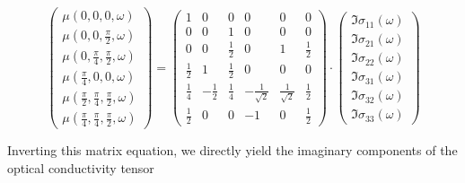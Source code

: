\documentclass[twocolumn,prb,twocolumn,amsmath,superscriptaddress,nofootinbib,amssymb]{revtex4-1}
\begin{document}
\begin{widetext}
\begin{equation}\label{eq: XAS non-magnetic}
\left(
\begin{array}{c}
\mu(0,0,0,\omega)  \\
\mu(0,0,\frac{\pi}{2},\omega)   \\
\mu(0,\frac{\pi}{4},\frac{\pi}{2},\omega)  \\
\mu(\frac{\pi}{4},0,0,\omega)   \\
\mu(\frac{\pi}{2},\frac{\pi}{4},\frac{\pi}{2},\omega)  \\
\mu(\frac{\pi}{4},\frac{\pi}{4},\frac{\pi}{2},\omega)
\end{array}
\right)
=
\left(
\begin{array}{cccccc}
1 & 0 & 0 & 0 & 0 & 0 \\
0 & 0 & 1 & 0 & 0 & 0 \\
0 & 0 & \frac{1}{2} & 0 & 1 & \frac{1}{2} \\
\frac{1}{2} & 1 & \frac{1}{2} & 0 & 0 & 0 \\
\frac{1}{4} & -\frac{1}{2} & \frac{1}{4} & -\frac{1}{\sqrt{2}} & \frac{1}{\sqrt{2}} & \frac{1}{2} \\
\frac{1}{2} & 0 & 0 & -1 & 0 & \frac{1}{2}
\end{array}
\right)\cdot
\left(
\begin{array}{c}
\Im{\sigma _{11}}(\omega)  \\
\Im{\sigma _{21}}(\omega)  \\
\Im{\sigma _{22}}(\omega)   \\
\Im{\sigma _{31}}(\omega)   \\
  \Im{\sigma _{32}}(\omega)  \\
  \Im{\sigma _{33}}(\omega)
\end{array}
\right)
\end{equation}

Inverting this matrix equation, we directly yield the imaginary components of the optical conductivity tensor


\end{widetext}
\end{document}
